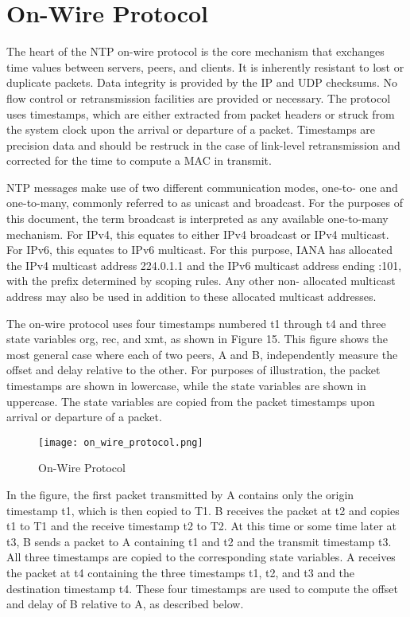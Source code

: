 \chapter{On-Wire Protocol}

The heart of the NTP on-wire protocol is the core mechanism that
exchanges time values between servers, peers, and clients. It is
inherently resistant to lost or duplicate packets. Data integrity is
provided by the IP and UDP checksums. No flow control or
retransmission facilities are provided or necessary. The protocol
uses timestamps, which are either extracted from packet headers or
struck from the system clock upon the arrival or departure of a
packet. Timestamps are precision data and should be restruck in the
case of link-level retransmission and corrected for the time to
compute a MAC in transmit.

NTP messages make use of two different communication modes, one-to-
one and one-to-many, commonly referred to as unicast and broadcast.
For the purposes of this document, the term broadcast is interpreted
as any available one-to-many mechanism. For IPv4, this equates to
either IPv4 broadcast or IPv4 multicast. For IPv6, this equates to
IPv6 multicast. For this purpose, IANA has allocated the IPv4
multicast address 224.0.1.1 and the IPv6 multicast address ending
:101, with the prefix determined by scoping rules. Any other non-
allocated multicast address may also be used in addition to these
allocated multicast addresses.

The on-wire protocol uses four timestamps numbered t1 through t4 and
three state variables org, rec, and xmt, as shown in Figure 15. This
figure shows the most general case where each of two peers, A and B,
independently measure the offset and delay relative to the other.
For purposes of illustration, the packet timestamps are shown in
lowercase, while the state variables are shown in uppercase. The
state variables are copied from the packet timestamps upon arrival or
departure of a packet.

\begin{figure}
\centering
\texttt{[image: on\_wire\_protocol.png]}
\caption{On-Wire Protocol}
\label{on_wire_protocol}
\end{figure}

In the figure, the first packet transmitted by A contains only the
origin timestamp t1, which is then copied to T1. B receives the
packet at t2 and copies t1 to T1 and the receive timestamp t2 to T2.
At this time or some time later at t3, B sends a packet to A
containing t1 and t2 and the transmit timestamp t3. All three
timestamps are copied to the corresponding state variables. A
receives the packet at t4 containing the three timestamps t1, t2, and
t3 and the destination timestamp t4. These four timestamps are used
to compute the offset and delay of B relative to A, as described
below.

